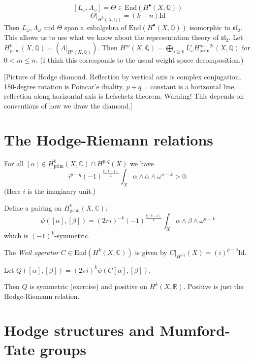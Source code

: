 \begin{enumerate}
\begin{enumerate}
$$
[L_\omega,\Lambda_\omega]=\Theta \in
\text{End}(H^\bullet(X,\mathbb{Q}))
$$
$$
\Theta|_{H^k(X,\mathbb{Q})}
=(k-n)\text{Id}
$$
Then $L_\omega, \Lambda_\omega$ and $\Theta$
span a subalgebra of
$\text{End}(H^\bullet(X,\mathbb{Q}))$
isomorphic to $\mathfrak{sl}_2$.
This allows us to use what we know about the
representation theory of $\mathfrak{sl}_2$.
Let
$H^k_{\text{prim}}(X,\mathbb{Q})=
(\Lambda|_{H^k(X,\mathbb{Q})})$.
Then $H^m(X,\mathbb{Q})=\bigoplus_{i \geq
0}L_\omega^i
H^{m-2i}_{\text{prim}}(X,\mathbb{Q})$
for $0 < m \leq n$.
(I think this corresponds to the usual
weight space decomposition.)

[Picture of Hodge diamond.
Reflection by vertical axis is complex
conjugation,
180-degree rotation is Poincar'e duality,
$p+q=$constant is a horizontal line,
reflection along horizontal axis is Lefschetz
theorem.
Warning! This depends on conventions of how
we draw the diamond.]
\end{enumerate}
\end{enumerate}

\section{The Hodge-Riemann relations}
\label{section-hodge-riemann}

\noindent
For all $[\alpha]\in
H^k_{\text{prim}}(X,\mathbb{C})\cap
H^{p,q}(X)$
we have
$$
i^{p-q}(-1)^{\frac{k(k-1)}{2}}
\int_X \alpha \wedge
\overline{\alpha}\wedge\omega^{n-k}>0.
$$
(Here $i$ is the imaginary unit.)

Define a pairing on
$H^k_{\text{prim}}(X,\mathbb{C})$:
$$
\psi([\alpha],[\beta])
=(2\pi i)^{-k}
(-1)^{\frac{k(k-1)}{2}}
\int_X \alpha\wedge\beta\wedge\omega^{n-k}
$$
which is $(-1)^k$-symmetric.

\begin{definition}
\label{definition-weil-operator}
The {\it Weil operator} $C \in
\text{End}(H^k(X,\mathbb{C}))$ is given by
$C|_{H^{p,q}}(X)=(i)^{p-q}\text{Id}$.
\end{definition}

\noindent
Let $Q([\alpha],[\beta])=(2\pi i)^k
\psi(C[\alpha],[\beta])$.

Then $Q$ is symmetric (exercise) and positive
on $H^k(X,\mathbb{R})$.
Positive is just the Hodge-Riemann relation.

\section{Hodge structures and Mumford-Tate
groups}
\label{section-hodge-struc-mumfo-tate-grou}
\label{section-mt-hodge-structures}

